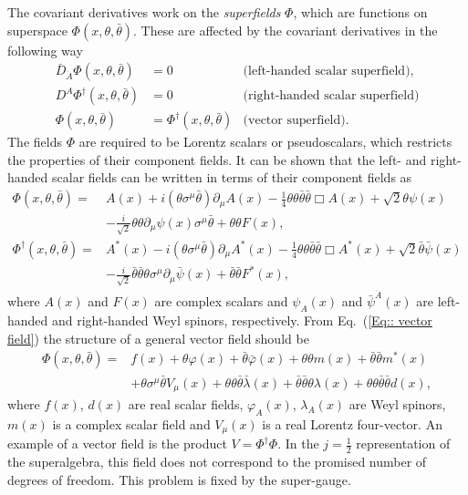 \documentclass[twoside,english]{uiofysmaster}
\begin{document}
The covariant derivatives work on the \textit{superfields} $\Phi$, which are functions on superspace $\Phi(x, \theta, \bar{\theta})$. These are affected by the covariant derivatives in the following way
\begin{align}
\bar{D}_{\dot{A}} \Phi (x, \theta, \bar{\theta}) &= 0 &\text{(left-handed scalar superfield)},\\
D^A \Phi^{\dagger} (x, \theta, \bar{\theta}) &= 0 &\text{(right-handed scalar superfield)}\\
\Phi (x, \theta, \bar{\theta}) &= \Phi^{\dagger} (x, \theta, \bar{\theta}) &\text{(vector superfield)}.\label{Eq:: vector field}
\end{align}
The fields $\Phi$ are required to be Lorentz scalars or pseudoscalars, which restricts the properties of their component fields. It can be shown that the left- and right-handed scalar fields can be written in terms of their component fields as  \cite{batzing2017lecture}
\begin{align}
\Phi (x, \theta, \bar{\theta}) =& A(x) + i (\theta \sigma^{\mu} \bar{\theta}) \partial_{\mu} A(x) - \frac{1}{4} \theta \theta \bar{\theta} \bar{\theta} \Box A(x) + \sqrt{2} \theta \psi (x)\nonumber \\ 
& - \frac{i}{\sqrt{2}} \theta \theta \partial_{\mu} \psi (x) \sigma^{\mu} \bar{\theta} + \theta \theta F(x),\\
\Phi^{\dagger} (x, \theta, \bar{\theta}) =& A^*(x) - i (\theta \sigma^{\mu} \bar{\theta}) \partial_{\mu} A^*(x) - \frac{1}{4} \theta \theta \bar{\theta} \bar{\theta} \Box A^*(x) + \sqrt{2} \bar{\theta} \bar{\psi} (x)\nonumber \\
& - \frac{i}{\sqrt{2}} \bar{\theta} \bar{\theta} \theta \sigma^{\mu} \partial_{\mu} \bar{\psi} (x)  + \bar{\theta} \bar{\theta} F^*(x),
\end{align}
where $A(x)$ and $F(x)$ are complex scalars and $\psi_A(x)$ and $\bar{\psi}^{\dot{A}} (x)$ are left-handed and right-handed Weyl spinors, respectively. From Eq.\ (\ref{Eq:: vector field}) the structure of a general vector field should be  \cite{batzing2017lecture}
\begin{align}
\Phi (x, \theta, \bar{\theta}) =& f(x) + \theta \varphi (x) + \bar{\theta} \bar{\varphi} (x) + \theta \theta m(x) + \bar{\theta} \bar{\theta} m^* (x) \nonumber \\
&+ \theta \sigma^{\mu} \bar{\theta} V_{\mu} (x) + \theta \theta \bar{\theta} \bar{\lambda} (x) + \bar{\theta} \bar{\theta} \theta \lambda (x) + \theta \theta \bar{\theta} \bar{\theta} d(x),
\end{align}
where $f(x)$, $d(x)$ are real scalar fields, $\varphi_A (x)$, $\lambda_A (x)$ are Weyl spinors, $m(x)$ is a complex scalar field and $V_{\mu} (x)$ is a real Lorentz four-vector. An example of a vector field is the product $V = \Phi^{\dagger} \Phi$. In the $j = \frac{1}{2}$ representation of the superalgebra, this field does not correspond to the promised number of degrees of freedom. This problem is fixed by the super-gauge. 
\end{document}
